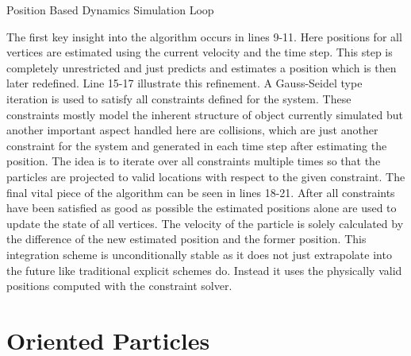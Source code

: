\begin{algorithm}[htb]
\caption{Position Based Dynamics Simulation Loop}
\begin{algorithmic}[1]
\ENDFOR
\LOOP
	 \ENDFOR
	 \ENDFOR
	  \ENDFOR
	\ENDWHILE
	\ENDFOR
\ENDLOOP
\end{algorithmic}
\end{algorithm}

The first key insight into the algorithm occurs in lines 9-11. Here positions for all vertices are estimated using the current velocity and the time step. This step is completely unrestricted and just predicts and estimates a position which is then later redefined. Line 15-17 illustrate this refinement. A Gauss-Seidel type iteration is used to satisfy all constraints defined for the system. These constraints mostly model the inherent structure of object currently simulated but another important aspect handled here are collisions, which are just another constraint for the system and generated in each time step after estimating the position. The idea is to iterate over all constraints multiple times so that the particles are projected to valid locations with respect to the given constraint. The final vital piece of the algorithm can be seen in lines 18-21. After all constraints have been satisfied as good as possible the estimated positions alone are used to update the state of all vertices. The velocity of the particle is solely calculated by the difference of the new estimated position and the former position. This integration scheme is unconditionally stable as it does not just extrapolate into the future like traditional explicit schemes do. Instead it uses the physically valid positions computed with the constraint solver.

\clearpage
\section{Oriented Particles}
\label{sec:oriented_particles}

